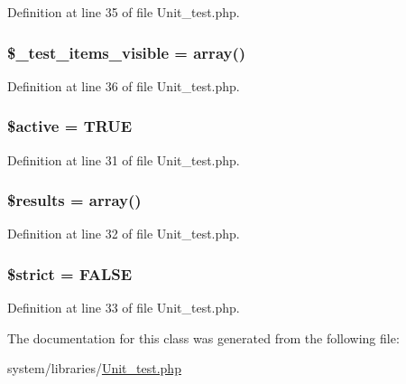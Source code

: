 Definition at line 35 of file Unit\-\_\-test.\-php.

\hypertarget{class_c_i___unit__test_aa8b5dd7058c9c945ed964e96777d72c4}{
\subsubsection[{\$\-\_\-test\-\_\-items\-\_\-visible}]{\setlength{\rightskip}{0pt plus 5cm}\$\-\_\-test\-\_\-items\-\_\-visible = array()}}\label{class_c_i___unit__test_aa8b5dd7058c9c945ed964e96777d72c4}


Definition at line 36 of file Unit\-\_\-test.\-php.

\hypertarget{class_c_i___unit__test_aacd1fa47b7ea59451aff98beca4360ae}{
\subsubsection[{\$active}]{\setlength{\rightskip}{0pt plus 5cm}\${\bf active} = T\-R\-U\-E}}\label{class_c_i___unit__test_aacd1fa47b7ea59451aff98beca4360ae}


Definition at line 31 of file Unit\-\_\-test.\-php.

\hypertarget{class_c_i___unit__test_a233d12bd8b6d3453e9a7a3f0b8c31db2}{
\subsubsection[{\$results}]{\setlength{\rightskip}{0pt plus 5cm}\$results = array()}}\label{class_c_i___unit__test_a233d12bd8b6d3453e9a7a3f0b8c31db2}


Definition at line 32 of file Unit\-\_\-test.\-php.

\hypertarget{class_c_i___unit__test_a856bf794dded1ba70be4dfae635a1b06}{
\subsubsection[{\$strict}]{\setlength{\rightskip}{0pt plus 5cm}\$strict = F\-A\-L\-S\-E}}\label{class_c_i___unit__test_a856bf794dded1ba70be4dfae635a1b06}


Definition at line 33 of file Unit\-\_\-test.\-php.



The documentation for this class was generated from the following file\-:\begin{DoxyCompactItemize}
\item 
system/libraries/\hyperlink{_unit__test_8php}{Unit\-\_\-test.\-php}\end{DoxyCompactItemize}
